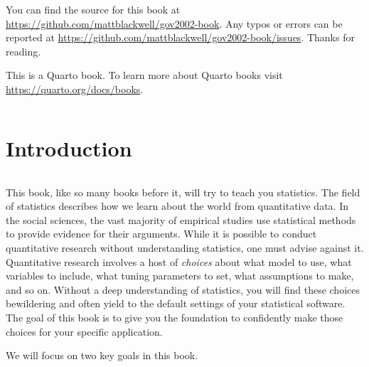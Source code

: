 \documentclass[
  letterpaper,
  DIV=11,
  numbers=noendperiod]{scrreprt}
\theoremstyle{definition}
\theoremstyle{plain}
\theoremstyle{definition}
\theoremstyle{remark}
\begin{document}
You can find the source for this book at
\url{https://github.com/mattblackwell/gov2002-book}. Any typos or errors
can be reported at
\url{https://github.com/mattblackwell/gov2002-book/issues}. Thanks for
reading.

This is a Quarto book. To learn more about Quarto books visit
\url{https://quarto.org/docs/books}.

\(\,\)


\hypertarget{introduction}{%
\chapter{Introduction}\label{introduction}}

\(\,\)

This book, like so many books before it, will try to teach you
statistics. The field of statistics describes how we learn about the
world from quantitative data. In the social sciences, the vast majority
of empirical studies use statistical methods to provide evidence for
their arguments. While it is possible to conduct quantitative research
without understanding statistics, one must advise against it.
Quantitative research involves a host of \emph{choices} about what model
to use, what variables to include, what tuning parameters to set, what
assumptions to make, and so on. Without a deep understanding of
statistics, you will find these choices bewildering and often yield to
the default settings of your statistical software. The goal of this book
is to give you the foundation to confidently make those choices for your
specific application.

We will focus on two key goals in this book.
\end{document}
